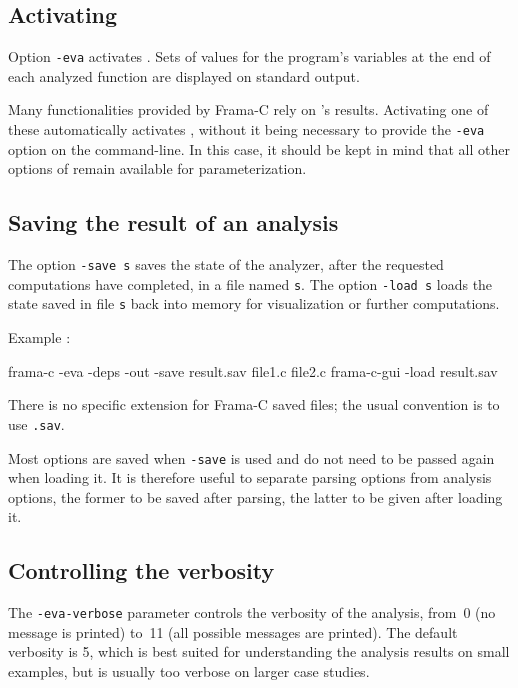 \documentclass{frama-c-book}
\begin{document}
\subsection{Activating \Eva{}}

Option \lstinline|-eva| activates \Eva{}. Sets of
values for the program's variables at the end of each analyzed function
are displayed on standard output.

Many functionalities provided by Frama-C rely on \Eva{}'s
results. Activating one of these automatically activates \Eva{},
without it being necessary to provide the \lstinline|-eva|
option on the command-line.  In this case, it should be kept in mind
that all other options of \Eva{} remain available for
parameterization.

\subsection{Saving the result of an analysis}
\label{saving-result}

The option \lstinline|-save s|
saves the state of the analyzer, after the requested
computations have completed,
in a file named \lstinline|s|.
The option \lstinline|-load s| loads the state saved in file \lstinline|s|
back into memory for visualization or further computations.
\medskip

Example :
\begin{frama-c-commands}
frama-c -eva -deps -out -save result.sav file1.c file2.c
frama-c-gui -load result.sav
\end{frama-c-commands}

\begin{important}
  There is no specific extension for Frama-C saved files; the usual
  convention is to use \verb|.sav|.
\end{important}

\begin{important}
  Most options are saved when \verb|-save| is used and do not need to
  be passed again when loading it. It is therefore useful to separate
  parsing options from analysis options, the former to be saved after
  parsing, the latter to be given after loading it.
\end{important}

\subsection{Controlling the verbosity}
\label{verbosity}

The \texttt{-eva-verbose} parameter controls the verbosity of the analysis,
from 0 (no message is printed) to 11 (all possible messages are printed).
The default verbosity is 5, which is best suited for understanding the analysis
results on small examples, but is usually too verbose on larger case studies.
\end{document}
